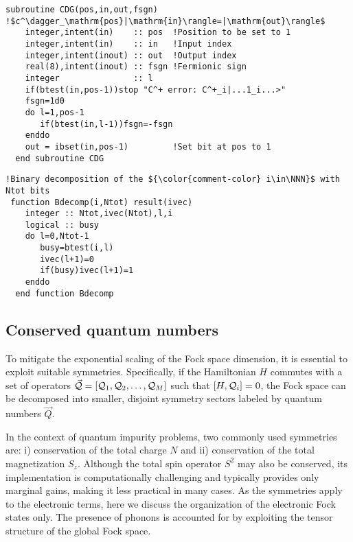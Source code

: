 \documentclass[edipack_sp.tex]{subfiles}
\begin{document}
\begin{lstlisting}[style=fstyle,numbers=none]
  subroutine CDG(pos,in,out,fsgn) !$c^\dagger_\mathrm{pos}|\mathrm{in}\rangle=|\mathrm{out}\rangle$
    integer,intent(in)    :: pos  !Position to be set to 1
    integer,intent(in)    :: in   !Input index
    integer,intent(inout) :: out  !Output index
    real(8),intent(inout) :: fsgn !Fermionic sign   
    integer               :: l
    if(btest(in,pos-1))stop "C^+ error: C^+_i|...1_i...>"
    fsgn=1d0
    do l=1,pos-1
       if(btest(in,l-1))fsgn=-fsgn
    enddo
    out = ibset(in,pos-1)         !Set bit at pos to 1
  end subroutine CDG
\end{lstlisting}


\begin{lstlisting}[style=fstyle,numbers=none]
 !Binary decomposition of the ${\color{comment-color} i\in\NNN}$ with Ntot bits
 function Bdecomp(i,Ntot) result(ivec)
    integer :: Ntot,ivec(Ntot),l,i
    logical :: busy
    do l=0,Ntot-1
       busy=btest(i,l)
       ivec(l+1)=0
       if(busy)ivec(l+1)=1
    enddo
  end function Bdecomp
\end{lstlisting}














\subsection{Conserved quantum numbers}\label{sSecQNs}
To mitigate the exponential scaling of the Fock space dimension, it 
is essential to exploit suitable symmetries. Specifically, if the 
Hamiltonian $H$ commutes with a set of operators ${\cal \vec{Q}}=[{\cal Q}_1,{\cal Q}_2,\dots,{\cal Q}_M]$ such that 
$[H, {\cal Q}_i] = 0$, the Fock space can be decomposed into smaller, 
disjoint symmetry sectors labeled by quantum numbers $\vec{Q}$.

In the context of quantum impurity problems, two commonly used 
symmetries are: i) conservation of the total charge $N$ and ii) 
conservation of the total magnetization $S_z$. Although the total 
spin operator $S^2$ may also be conserved, its implementation is 
computationally challenging and typically provides only marginal 
gains, making it less practical in many cases.
As the symmetries apply to the electronic terms, here we discuss the organization of the electronic Fock states only. The presence of phonons is accounted for by exploiting the tensor structure of the global Fock space.  
\end{document}

